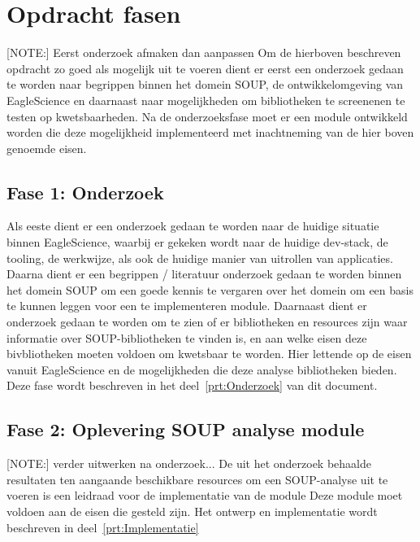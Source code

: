 \section{Opdracht fasen}\label{sec:opdracht-fasen}
[NOTE:] Eerst onderzoek afmaken dan aanpassen
Om de hierboven beschreven opdracht zo goed als mogelijk uit te voeren dient er eerst een onderzoek gedaan te worden naar begrippen binnen het domein SOUP, de ontwikkelomgeving van EagleScience en daarnaast naar mogelijkheden om bibliotheken te screenenen te testen op kwetsbaarheden. Na de onderzoeksfase moet er een module ontwikkeld worden die deze mogelijkheid implementeerd met inachtneming van de  hier boven genoemde eisen.

\subsection{Fase 1: Onderzoek} \label{subsec:fase-1:-onderzoek}
Als eeste dient er een onderzoek gedaan te worden naar de huidige situatie binnen EagleScience, waarbij er gekeken wordt naar de huidige dev-stack, de tooling, de werkwijze, als ook de huidige manier van uitrollen van applicaties. Daarna dient er een begrippen / literatuur onderzoek gedaan te worden binnen het domein SOUP om een goede kennis te vergaren over het domein om een basis te kunnen leggen voor een te implementeren module. Daarnaast dient er onderzoek gedaan te worden om te zien of er bibliotheken en resources zijn waar informatie over SOUP-bibliotheken te vinden is, en aan welke eisen deze bivbliotheken moeten voldoen om kwetsbaar te worden. Hier lettende op de eisen vanuit EagleScience en de mogelijkheden die deze analyse bibliotheken bieden. Deze fase wordt beschreven in het deel~\ref{prt:Onderzoek} van dit document.

\subsection{Fase 2: Oplevering SOUP analyse module}\label{subsec:fase-2:-oplevering-soup-analyse-module}
[NOTE:] verder uitwerken na onderzoek...
De uit het onderzoek behaalde resultaten ten aangaande beschikbare resources om een SOUP-analyse uit te voeren is een leidraad voor de implementatie van de module Deze module moet voldoen aan de eisen die gesteld zijn. Het ontwerp en implementatie wordt beschreven in deel~\ref{prt:Implementatie}
